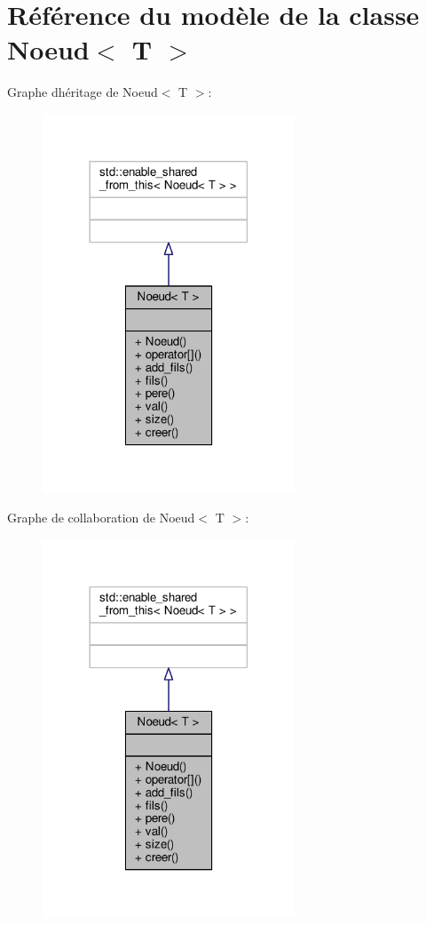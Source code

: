 \hypertarget{classNoeud}{}\section{Référence du modèle de la classe Noeud$<$ T $>$}
\label{classNoeud}


Graphe d\textquotesingle{}héritage de Noeud$<$ T $>$\+:\nopagebreak
\begin{figure}[H]
\begin{center}
\leavevmode
\includegraphics[width=213pt]{classNoeud__inherit__graph}
\end{center}
\end{figure}


Graphe de collaboration de Noeud$<$ T $>$\+:\nopagebreak
\begin{figure}[H]
\begin{center}
\leavevmode
\includegraphics[width=213pt]{classNoeud__coll__graph}
\end{center}
\end{figure}
